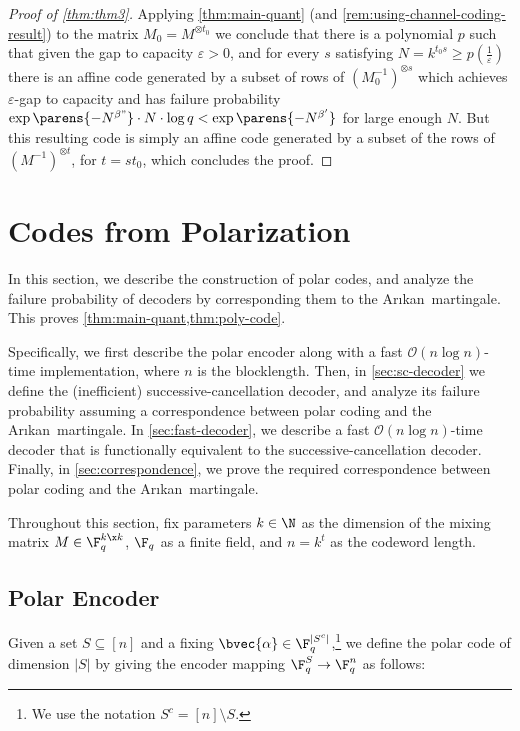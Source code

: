 \documentclass[11pt]{article}
\newcommand{\Arikan}{Ar\i kan}
\begin{document}
\begin{proof}[Proof of \cref{thm:thm3}]
	
	Applying \cref{thm:main-quant} (and \cref{rem:using-channel-coding-result}) to the matrix $M_0 = M^{\otimes t_0}$ we conclude that there is a polynomial $p$ such that  given the gap to capacity $\varepsilon > 0$, and for every $s$ satisfying $N = k^{t_0 s} \geq p(\frac{1}{\varepsilon})$ there is an affine code generated by a subset of rows of $(M_0^{-1})^{\otimes s}$ which achieves $\varepsilon$-gap to capacity and has failure probability $\exp\parens{-N^{\beta"}}\cdot N\cdot \log{q}<\exp\parens{-N^{\beta'}}$ for large enough $N$. But this resulting code is simply an affine code generated by a subset of the rows of $(M^{-1})^{\otimes t}$, for $t = s t_0$, which concludes the proof. 
\end{proof}




\newpage
\appendix

\renewcommand{\t}{\widetilde}
\newcommand{\USC}{\bvec{\hat U}^{\textsc{SC}}}
\newcommand{\UF}{\bvec{\hat U}^{\textsc{F}}}
\newcommand{\UpF}{\bvec{\hat U}^{\prime\textsc{F}}}
\newcommand{\Zpj}{\bvec{Z}^{\prime (j)}}

\section{Codes from Polarization}
\label{sec:codes-from-polarization}

In this section, we describe the construction of polar codes,
and analyze the failure probability of decoders by corresponding
them to the \Arikan\ martingale.
This proves \cref{thm:main-quant,thm:poly-code}.

Specifically, 
we first describe the polar encoder
along with a fast $\mathcal{O}(n \log n)$-time implementation,
where $n$ is the blocklength.
Then, in \cref{sec:sc-decoder}
we define the (inefficient) successive-cancellation decoder,
and analyze its failure probability assuming a
correspondence between polar coding and the \Arikan\ martingale.
In \cref{sec:fast-decoder}, we describe a fast $\mathcal{O}(n \log n)$-time decoder
that is functionally equivalent to the successive-cancellation decoder.
Finally, in \cref{sec:correspondence},
we prove the required correspondence between polar coding and the \Arikan\
martingale.

Throughout this section, fix parameters
$k \in \N$ as the dimension of the mixing matrix $M \in \F_q^{k \x k}$, $\F_q$ as a finite field, and
$n = k^t$ as the codeword length.

\subsection{Polar Encoder}
\label{sec:polar-encoder}
Given a
set $S \subseteq [n]$ and a fixing
$\bvec{\alpha} \in \F_q^{|S^c|}$,\footnote{We use the notation $S^c=[n]\setminus S$.}
we define the polar code of dimension $|S|$ by giving the encoder mapping
$\F_q^S \to \F_q^n$
as follows:
\end{document}
